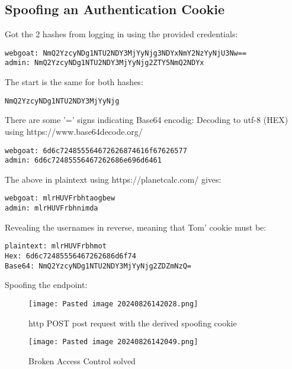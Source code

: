 \documentclass[
	letterpaper, %
	10pt, %
	unnumberedsections, %
	twoside, %
]{APAAssignment}
\begin{document}
\begin{appendices}
\clearpage
\subsection{Spoofing an Authentication Cookie}
Got the 2 hashes from logging in using the provided credentials:

\begin{verbatim}
webgoat: NmQ2YzcyNDg1NTU2NDY3MjYyNjg3NDYxNmY2NzYyNjU3Nw==
admin: NmQ2YzcyNDg1NTU2NDY3MjYyNjg2ZTY5NmQ2NDYx
\end{verbatim}


The start is the same for both hashes:

\begin{verbatim}
NmQ2YzcyNDg1NTU2NDY3MjYyNjg
\end{verbatim}


There are some '=' signs indicating Base64 encodig:
Decoding to utf-8 (HEX) using https://www.base64decode.org/

\begin{verbatim}
webgoat: 6d6c724855564672626874616f67626577
admin: 6d6c72485556467262686e696d6461
\end{verbatim}


The above in plaintext using https://planetcalc.com/ gives:

\begin{verbatim}
webgoat: mlrHUVFrbhtaogbew
admin: mlrHUVFrbhnimda
\end{verbatim}

Revealing the usernames in reverse, meaning that Tom' cookie must be:

\begin{verbatim}
plaintext: mlrHUVFrbhmot
Hex: 6d6c72485556467262686d6f74
Base64: NmQ2YzcyNDg1NTU2NDY3MjYyNjg2ZDZmNzQ=
\end{verbatim}

Spoofing the endpoint: 

\begin{figure}[!ht] %
	\centering
	\texttt{[image: Pasted image 20240826142028.png]}
	\caption{http POST post request with the derived spoofing cookie}
	\label{fig:SpoofPost}
\end{figure}

\begin{figure}[!ht] %
	\centering
	\texttt{[image: Pasted image 20240826142049.png]}
	\caption{Broken Access Control solved}
	\label{fig:BrokenAccessControlSolvedCheck}
\end{figure}


\end{appendices}
\end{document}
